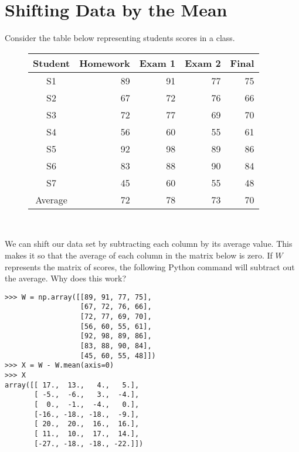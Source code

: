 \label{Stats1}


\section*{Shifting Data by the Mean}

Consider the table below representing students scores in a class.\\

\begin{figure}[h!]
\begin{center}
\begin{tabular}{|c|r|r|r|r|}
	\hline
Student & Homework & Exam 1  & Exam 2 & Final \\
\hline
S1  & 89 & 91 & 77 & 75 \\
S2  & 67 & 72 & 76 & 66 \\
S3  & 72 & 77 & 69 & 70 \\
S4  & 56 & 60 & 55 & 61 \\
S5  & 92 & 98 & 89 & 86 \\
S6  & 83 & 88 & 90 & 84 \\
S7  & 45 & 60 & 55 & 48 \\
\hline
Average  & 72 & 78 & 73 & 70\\
\hline
\end{tabular}\\
\end{center}
\end{figure}

We can shift our data set by subtracting each column by its average value.  This makes it so that the average of each column in the matrix below is zero.  If $W$ represents the matrix of scores, the following Python command will subtract out the average.  Why does this work?
\begin{lstlisting}
>>> W = np.array([[89, 91, 77, 75],
                  [67, 72, 76, 66],
                  [72, 77, 69, 70],
                  [56, 60, 55, 61],
                  [92, 98, 89, 86],
                  [83, 88, 90, 84],
                  [45, 60, 55, 48]])
>>> X = W - W.mean(axis=0)
>>> X
array([[ 17.,  13.,   4.,   5.],
       [ -5.,  -6.,   3.,  -4.],
       [  0.,  -1.,  -4.,   0.],
       [-16., -18., -18.,  -9.],
       [ 20.,  20.,  16.,  16.],
       [ 11.,  10.,  17.,  14.],
       [-27., -18., -18., -22.]])
\end{lstlisting}



